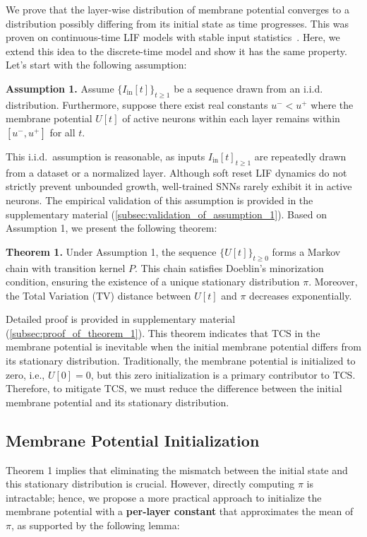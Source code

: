 We prove that the layer-wise distribution of membrane potential converges to a distribution possibly differing from its initial state as time progresses. This was proven on continuous-time LIF models with stable input statistics~\cite{dumont:2017}. Here, we extend this idea to the discrete-time model and show it has the same property. Let's start with the following assumption:

\textbf{Assumption 1.}
Assume $\{I_{\text{in}}[t]\}_{t\ge1}$ be a sequence drawn from an i.i.d. distribution. Furthermore, suppose there exist real constants $u^- < u^+$ where the membrane potential $U[t]$ of active neurons within each layer remains within $[u^-, u^+]$ for all $t$.

This i.i.d.\ assumption is reasonable, as inputs ${I_{\text{in}}[t]}_{t\ge1}$ are repeatedly drawn from a dataset or a normalized layer. Although soft reset LIF dynamics do not strictly prevent unbounded growth, well-trained SNNs rarely exhibit it in active neurons. The empirical validation of this assumption is provided in the supplementary material (\cref{subsec:validation_of_assumption_1}). Based on Assumption 1, we present the following theorem:

\textbf{Theorem 1.}
Under Assumption 1, the sequence $\{U[t]\}_{t \ge 0}$ forms a Markov chain with transition kernel $P$. This chain satisfies Doeblin’s minorization condition, ensuring the existence of a unique stationary distribution $\pi$. Moreover, the Total Variation (TV) distance between $U[t]$ and $\pi$ decreases exponentially.

Detailed proof is provided in supplementary material (\cref{subsec:proof_of_theorem_1}). This theorem indicates that TCS in the membrane potential is inevitable when the initial membrane potential differs from its stationary distribution. Traditionally, the membrane potential is initialized to zero, i.e., \(U[0] = 0\), but this zero initialization is a primary contributor to TCS. Therefore, to mitigate TCS, we must reduce the difference between the initial membrane potential and its stationary distribution.

\subsection{Membrane Potential Initialization}

Theorem 1 implies that eliminating the mismatch between the initial state and this stationary distribution is crucial. However, directly computing \(\pi\) is intractable; hence, we propose a more practical approach to initialize the membrane potential with a \textbf{per-layer constant} that approximates the mean of \( \pi \), as supported by the following lemma:


